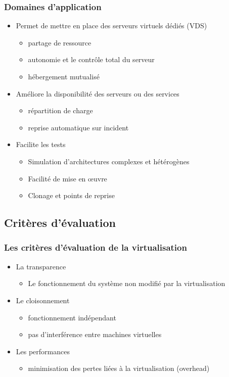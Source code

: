\begin{frame}
\frametitle{Domaines d’application}
\begin{itemize}
  \item <1->Permet de mettre en place des serveurs virtuels dédiés (VDS)
   \begin{itemize}
  \item partage de ressource
  \item autonomie et le contrôle total du serveur
  \item hébergement mutualisé
\end{itemize}

\item <2->Améliore la disponibilité des serveurs ou des services
\begin{itemize}
  \item répartition de charge
\item reprise automatique sur incident

\end{itemize}
\item <3>Facilite les tests
\begin{itemize}
  \item Simulation d'architectures complexes et hétérogènes
  \item Facilité de mise en œuvre
  \item Clonage et points de reprise
\end{itemize}

\end{itemize}
\end{frame}



\subsection{Critères d'évaluation}

\begin{frame}
\frametitle{Les critères d'évaluation de la virtualisation}
\begin{itemize}
\item La transparence
\begin{itemize}
\item Le fonctionnement du système non modifié par la virtualisation
\end{itemize}
\item Le cloisonnement
\begin{itemize}
\item fonctionnement indépendant
\item pas d'interférence entre machines virtuelles
\end{itemize}
\item Les performances
\begin{itemize}
\item minimisation des pertes liées à la virtualisation (overhead)
\end{itemize}
\end{itemize}
\end{frame}

